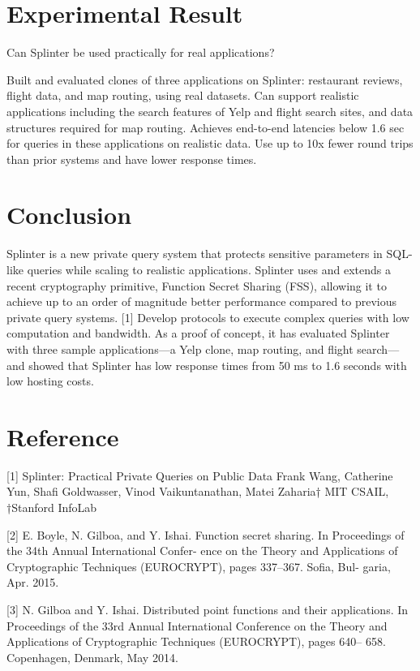 \documentclass[12pt,a4paper]{article}
\begin{document}
\begin{multicols}{2}
\section{Experimental Result}
Can Splinter be used practically for real applications?  

Built and evaluated clones of three applications on Splinter: restaurant reviews, flight data, and map routing, using real datasets.
Can support realistic applications including the search features of Yelp and flight search sites, and data structures required for map routing.
Achieves end-to-end latencies below 1.6 sec for queries in these applications on realistic data.
Use up to 10x fewer round trips than prior systems and have lower response times. 
 
\section{Conclusion}
Splinter is a new private query system that protects sensitive parameters in SQL-like queries while scaling to realistic applications. Splinter uses and extends a recent cryptography primitive, Function Secret Sharing (FSS), allowing it to achieve up to an order of magnitude better performance compared to previous private query systems. [1] Develop protocols to execute complex queries with low computation and bandwidth. As a proof of concept, it has evaluated Splinter with three sample applications—a Yelp clone, map routing, and flight search—and showed that Splinter has low response times from 50 ms to 1.6 seconds with low hosting costs.

\section{Reference}
[1] Splinter: Practical Private Queries on Public 
Data Frank Wang, Catherine Yun, Shafi Goldwasser, 
Vinod Vaikuntanathan, Matei Zaharia† MIT CSAIL, 
†Stanford InfoLab

[2] E. Boyle, N. Gilboa, and Y. Ishai. Function 
secret sharing. In Proceedings of the 34th Annual 
International Confer- ence on the Theory and 
Applications of Cryptographic Techniques 
(EUROCRYPT), pages 337–367. Sofia, Bul- garia, Apr. 
2015.

[3] N. Gilboa and Y. Ishai. Distributed point 
functions and their applications. In Proceedings of 
the 33rd Annual International Conference on the 
Theory and Applications of Cryptographic Techniques 
(EUROCRYPT), pages 640– 658. Copenhagen, Denmark, 
May 2014.


\end{multicols}
\end{document}
